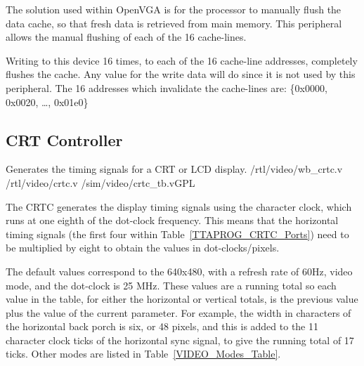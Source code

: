 The solution used within OpenVGA is for the processor to manually flush the data
cache, so that fresh data is retrieved from main memory. This peripheral allows
the manual flushing of each of the 16 cache-lines.

Writing to this device 16 times, to each of the 16 cache-line addresses,
completely flushes the cache. Any value for the write data will do since it is
not used by this peripheral. The 16 addresses which invalidate the cache-lines
are: \{0x0000, 0x0020, \ldots, 0x01e0\}


\subsection{CRT Controller}
\label{TTAPROG_CRTC}

%
{Generates the timing signals for a CRT or LCD display.}%
{/rtl/video/wb\_crtc.v /rtl/video/crtc.v}%
{/sim/video/crtc\_tb.v}{GPL}


The CRTC generates the display timing signals using the character clock, which
runs at one eighth of the dot-clock frequency. This means that the horizontal
timing signals (the first four within Table~\ref{TTAPROG_CRTC_Ports}) need to
be multiplied by eight to obtain the values in dot-clocks/pixels.

The default values correspond to the 640x480, with a refresh rate of 60Hz, video
mode, and the dot-clock is 25 MHz. These values are a running total so each value
in the table, for either the horizontal or vertical totals, is the previous value
plus the value of the current parameter. For example, the width in characters of
the horizontal back porch is six, or 48 pixels, and this is added to the 11
character clock ticks of the horizontal sync signal, to give the running total of
17 ticks. Other modes are listed in Table~\ref{VIDEO_Modes_Table}.

